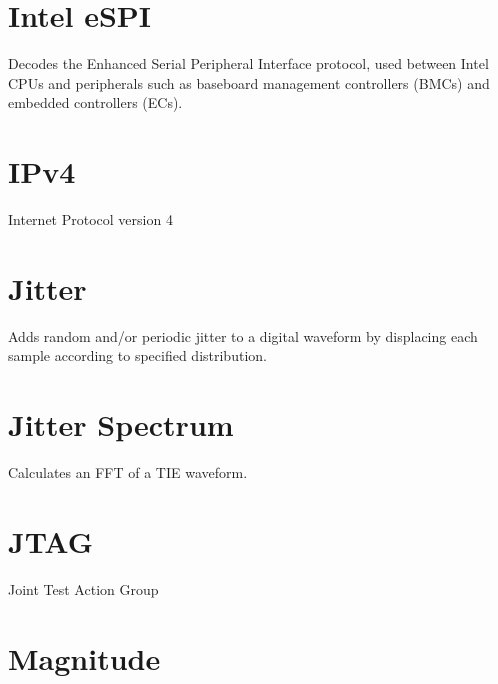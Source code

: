 \pagebreak
\section{Intel eSPI}

Decodes the Enhanced Serial Peripheral Interface protocol, used between Intel CPUs and peripherals such as baseboard
management controllers (BMCs) and embedded controllers (ECs).

\pagebreak
\section{IPv4}

Internet Protocol version 4

\pagebreak
\section{Jitter}

Adds random and/or periodic jitter to a digital waveform by displacing each sample according to specified distribution.

\pagebreak
\section{Jitter Spectrum}

Calculates an FFT of a TIE waveform.

\pagebreak
\section{JTAG}

Joint Test Action Group

\pagebreak
\section{Magnitude}

